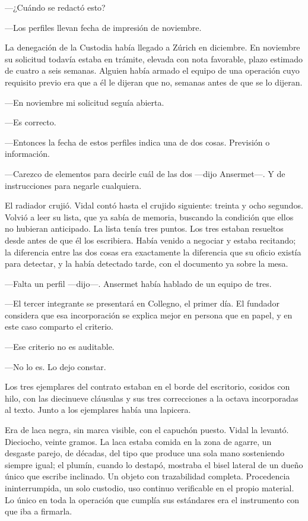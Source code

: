 ---¿Cuándo se redactó esto?

---Los perfiles llevan fecha de impresión de noviembre.

La denegación de la Custodia había llegado a Zúrich en diciembre. En noviembre su solicitud todavía estaba en trámite, elevada con nota favorable, plazo estimado de cuatro a seis semanas. Alguien había armado el equipo de una operación cuyo requisito previo era que a él le dijeran que no, semanas antes de que se lo dijeran.

---En noviembre mi solicitud seguía abierta.

---Es correcto.

---Entonces la fecha de estos perfiles indica una de dos cosas. Previsión o información.

---Carezco de elementos para decirle cuál de las dos ---dijo Ansermet---. Y de instrucciones para negarle cualquiera.

El radiador crujió. Vidal contó hasta el crujido siguiente: treinta y ocho segundos. Volvió a leer su lista, que ya sabía de memoria, buscando la condición que ellos no hubieran anticipado. La lista tenía tres puntos. Los tres estaban resueltos desde antes de que él los escribiera. Había venido a negociar y estaba recitando; la diferencia entre las dos cosas era exactamente la diferencia que su oficio existía para detectar, y la había detectado tarde, con el documento ya sobre la mesa.

---Falta un perfil ---dijo---. Ansermet había hablado de un equipo de tres.

---El tercer integrante se presentará en Collegno, el primer día. El fundador considera que esa incorporación se explica mejor en persona que en papel, y en este caso comparto el criterio.

---Ese criterio no es auditable.

---No lo es. Lo dejo constar.

Los tres ejemplares del contrato estaban en el borde del escritorio, cosidos con hilo, con las diecinueve cláusulas y sus tres correcciones a la octava incorporadas al texto. Junto a los ejemplares había una lapicera.

Era de laca negra, sin marca visible, con el capuchón puesto. Vidal la levantó. Dieciocho, veinte gramos. La laca estaba comida en la zona de agarre, un desgaste parejo, de décadas, del tipo que produce una sola mano sosteniendo siempre igual; el plumín, cuando lo destapó, mostraba el bisel lateral de un dueño único que escribe inclinado. Un objeto con trazabilidad completa. Procedencia ininterrumpida, un solo custodio, uso continuo verificable en el propio material. Lo único en toda la operación que cumplía sus estándares era el instrumento con que iba a firmarla.

